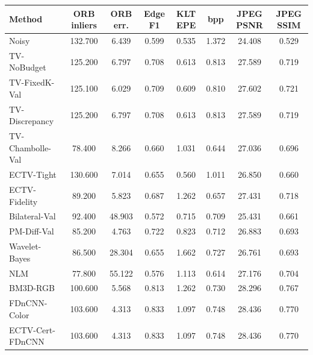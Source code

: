 \begin{tabular}{lccccccc}
\toprule
Method & ORB inliers & ORB err. & Edge F1 & KLT EPE & bpp & JPEG PSNR & JPEG SSIM \\
\midrule
Noisy & 132.700 & 6.439 & 0.599 & 0.535 & 1.372 & 24.408 & 0.529 \\
TV-NoBudget & 125.200 & 6.797 & 0.708 & 0.613 & 0.813 & 27.589 & 0.719 \\
TV-FixedK-Val & 125.100 & 6.029 & 0.709 & 0.609 & 0.810 & 27.602 & 0.721 \\
TV-Discrepancy & 125.200 & 6.797 & 0.708 & 0.613 & 0.813 & 27.589 & 0.719 \\
TV-Chambolle-Val & 78.400 & 8.266 & 0.660 & 1.031 & 0.644 & 27.036 & 0.696 \\
ECTV-Tight & 130.600 & 7.014 & 0.655 & 0.560 & 1.011 & 26.850 & 0.660 \\
ECTV-Fidelity & 89.200 & 5.823 & 0.687 & 1.262 & 0.657 & 27.431 & 0.718 \\
Bilateral-Val & 92.400 & 48.903 & 0.572 & 0.715 & 0.709 & 25.431 & 0.661 \\
PM-Diff-Val & 85.200 & 4.763 & 0.722 & 0.823 & 0.712 & 26.883 & 0.693 \\
Wavelet-Bayes & 86.500 & 28.304 & 0.655 & 1.662 & 0.727 & 26.761 & 0.693 \\
NLM & 77.800 & 55.122 & 0.576 & 1.113 & 0.614 & 27.176 & 0.704 \\
BM3D-RGB & 100.600 & 5.568 & 0.813 & 1.262 & 0.730 & 28.296 & 0.767 \\
FDnCNN-Color & 103.600 & 4.313 & 0.833 & 1.097 & 0.748 & 28.436 & 0.770 \\
ECTV-Cert-FDnCNN & 103.600 & 4.313 & 0.833 & 1.097 & 0.748 & 28.436 & 0.770 \\
\bottomrule
\end{tabular}
